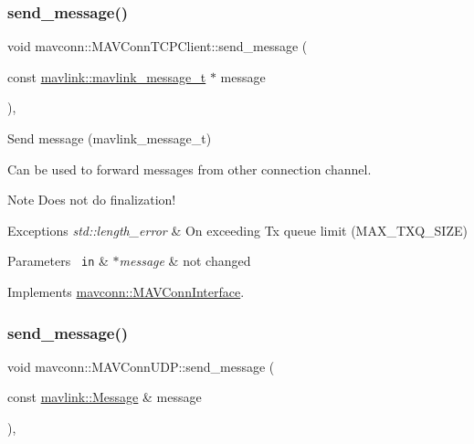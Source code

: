\subsubsection{\texorpdfstring{send\_message()}{send\_message()}\hspace{0.1cm}{\footnotesize\ttfamily [4/10]}}
{\footnotesize\ttfamily void mavconn\+::\+M\+A\+V\+Conn\+T\+C\+P\+Client\+::send\+\_\+message (\begin{DoxyParamCaption}\item[{const \mbox{\hyperlink{include__v0_89_2mavlink__types_8h_a63b963764c09dc72f4910c1521e325b9}{mavlink\+::mavlink\+\_\+message\+\_\+t}} $\ast$}]{message }\end{DoxyParamCaption})\hspace{0.3cm}{\ttfamily [override]}, {\ttfamily [virtual]}}



Send message (mavlink\+\_\+message\+\_\+t) 

Can be used to forward messages from other connection channel.

\begin{DoxyNote}{Note}
Does not do finalization!
\end{DoxyNote}

\begin{DoxyExceptions}{Exceptions}
{\em std\+::length\+\_\+error} & On exceeding Tx queue limit (M\+A\+X\+\_\+\+T\+X\+Q\+\_\+\+S\+I\+ZE) \\
\hline
\end{DoxyExceptions}

\begin{DoxyParams}[1]{Parameters}
\mbox{\texttt{ in}}  & {\em $\ast$message} & not changed \\
\hline
\end{DoxyParams}


Implements \mbox{\hyperlink{group__mavconn_gad807cf7e1935548e0c7ba94943cbb7aa}{mavconn\+::\+M\+A\+V\+Conn\+Interface}}.

\mbox{\label{group__mavconn_gae5e3ad4657f7aa9e970d0cb7a6bc367d}} 
\subsubsection{\texorpdfstring{send\_message()}{send\_message()}\hspace{0.1cm}{\footnotesize\ttfamily [5/10]}}
{\footnotesize\ttfamily void mavconn\+::\+M\+A\+V\+Conn\+U\+D\+P\+::send\+\_\+message (\begin{DoxyParamCaption}\item[{const \mbox{\hyperlink{structmavlink_1_1Message}{mavlink\+::\+Message}} \&}]{message }\end{DoxyParamCaption})\hspace{0.3cm}{\ttfamily [override]}, {\ttfamily [virtual]}}



